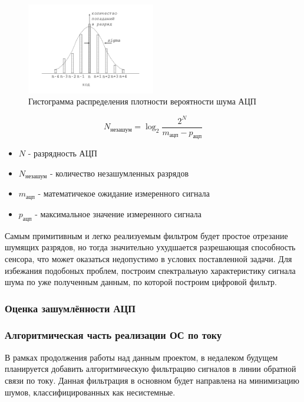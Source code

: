 \begin{figure}[!ht]
    \centering
    \includegraphics[width=0.5\textwidth, keepaspectratio, clip=true, trim=5mm 10mm 5mm 5mm]
                    {./src/pictures/adc_noise_probabilistic_estimate}
    \caption{Гистограмма распределения плотности вероятности шума АЦП}
    \label{pic_adc_noise_probabilistic_estimate}
\end{figure}

\begin{equation}
    \label{eq_noise_free_code_resolution}
    N_{\text{незашум}} = \log_{2} \frac{ 2^{N} }{ m_{\text{ацп}} - p_{\text{ацп}} }
\end{equation}

\begin{itemize}
    \item $ N $ - разрядность АЦП
    \item $ N_{\text{незашум}} $ - количество незашумленных разрядов
    \item $ m_{\text{ацп}} $ - математичекое ожидание измеренного сигнала
    \item $ p_{\text{ацп}} $ - максимальное значение измеренного сигнала
\end{itemize}

Самым примитивным и легко реализуемым фильтром будет простое отрезание шумящих разрядов,
но тогда значительно ухудшается разрешающая способность сенсора, что может
оказаться недопустимо в услових поставленной задачи. Для избежания подобоных проблем,
построим спектральную характеристику сигнала шума по уже полученным данным, по которой
построим цифровой фильтр.

\ifdefined\DIPLOMA
\subsubsection{Оценка зашумлённости АЦП}
\fi

\subsubsection{Алгоритмическая часть реализации ОС по току}
\ifdefined\DIPLOMA
\else
    В рамках продолжения работы над данным проектом, в недалеком будущем планируется добавить
    алгоритмическую фильтрацию сигналов в линии обратной связи по току. Данная фильтрация в
    основном будет направлена на минимизацию шумов, классифицированных как несистемные.
\fi
